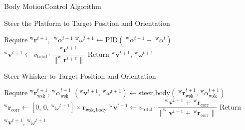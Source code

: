 \documentclass[AIRbeamer
,optEnglish
,optBiber
,optBibstyleAlphabetic
,optBeamerClassicFormat%
]{AIRlatex}
\begin{document}
    \begin{frame}{Body Motion}{Control Algorithm}
        \begin{algorithm}[H]
            \caption{Steer the Platform to Target Position and Orientation}
            \begin{algorithmic}[1]
                \State Require \(^{\mathrm{w}}\boldsymbol{r}^{t+1}\), \(\;^{\mathrm{w}}\alpha^{t+1}\)
                \State \(^{\mathrm{w}}\omega^{t+1} \gets \mathrm{PID}(\;^{\mathrm{w}}\alpha^{t+1} - \;^{\mathrm{w}}\alpha^{t})\)
                \State \(^{\mathrm{w}}\boldsymbol{v}^{t+1} \gets v_{\mathrm{total}} \cdot \dfrac{^{\mathrm{w}}\boldsymbol{r}^{t+1}}{\|^{\mathrm{w}}\boldsymbol{r}^{t+1}\|}\)
                \State Return \(^{\mathrm{w}}\boldsymbol{v}^{t+1}\), \(^{\mathrm{w}}\omega^{t+1}\)
            \end{algorithmic}
            \label{alg:steer_platform}
        \end{algorithm}

        \begin{algorithm}[H]
            \caption{Steer Whisker to Target Position and Orientation}
            \begin{algorithmic}[1]
                \State Require \(^{\mathrm{w}}\boldsymbol{r}_{\mathrm{wsk}}^{t+1}\), \(^{\mathrm{w}}\alpha_{\mathrm{wsk}}^{t+1}\)
                \State \((^{\mathrm{w}}\boldsymbol{v}^{t+1},\, ^{\mathrm{w}}\omega^{t+1}) \gets \mathrm{steer\_body}(\;^{\mathrm{w}}\boldsymbol{r}_{\mathrm{wsk}}^{t+1},\, ^{\mathrm{w}}\alpha_{\mathrm{wsk}}^{t+1})\)
                \State \(^{\mathrm{w}}\boldsymbol{r}_{\mathrm{corr}} \gets [0,\,0,\,^{\mathrm{w}}\omega^{t+1}] \times \boldsymbol{r}_{\mathrm{wsk, body}}\)
                \State \(^{\mathrm{w}}\boldsymbol{v}^{t+1} \gets v_{\mathrm{total}} \cdot \dfrac{^{\mathrm{w}}\boldsymbol{v}^{t+1} + \,^{\mathrm{w}}\boldsymbol{r}_{\mathrm{corr}}}{\|^{\mathrm{w}}\boldsymbol{v}^{t+1} + \,^{\mathrm{w}}\boldsymbol{r}_{\mathrm{corr}}\|}\)
                \State Return \(^{\mathrm{w}}\boldsymbol{v}^{t+1}\), \(^{\mathrm{w}}\omega^{t+1}\)
            \end{algorithmic}
            \label{alg:steer_whisker}
        \end{algorithm}

    \end{frame}
\end{document}
